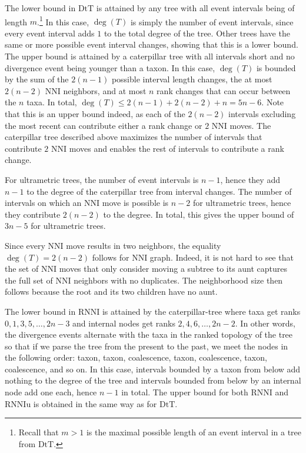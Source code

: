 \documentclass[11pt]{amsart}
\theoremstyle{definition}
\newcommand{\nni}{\mathrm{NNI}}
\newcommand{\rnni}{\mathrm{RNNI}}
\newcommand{\rnniu}{\mathrm{RNNIu}}
\newcommand{\dtt}{\mathrm{DtT}}
\begin{document}
\proof
The lower bound in $\dtt$ is attained by any tree with all event intervals being of length $m$.\footnote{
Recall that $m > 1$ is the maximal possible length of an event interval in a tree from $\dtt$.}
In this case, $\deg(T)$ is simply the number of event intervals, since every event interval adds $1$ to the total degree of the tree.
Other trees have the same or more possible event interval changes, showing that this is a lower bound.
The upper bound is attained by a caterpillar tree with all intervals short and no divergence event being younger than a taxon.
In this case, $\deg(T)$ is bounded by the sum of the $2(n-1)$ possible interval length changes, the at most $2(n-2)$ $\nni$ neighbors, and at most $n$ rank changes that can occur between the $n$ taxa.
In total, $\deg(T) \le 2(n-1) + 2(n-2) + n = 5n-6$.
Note that this is an upper bound indeed, as each of the $2(n-2)$ intervals excluding the most recent can contribute either a rank change or $2$ $\nni$ moves.
The caterpillar tree described above maximizes the number of intervals that contribute $2$ $\nni$ moves and enables the rest of intervals to contribute a rank change.

For ultrametric trees, the number of event intervals is $n-1$, hence they add $n-1$ to the degree of the caterpillar tree from interval changes.
The number of intervals on which an $\nni$ move is possible is $n-2$ for ultrametric trees, hence they contribute $2(n-2)$ to the degree.
In total, this gives the upper bound of $3n-5$ for ultrametric trees.

Since every $\nni$ move results in two neighbors, the equality $\deg(T) = 2(n-2)$ follows for $\nni$ graph.
Indeed, it is not hard to see that the set of $\nni$ moves that only consider moving a subtree to its aunt captures the full set of $\nni$ neighbors with no duplicates.
The neighborhood size then follows because the root and its two children have no aunt.

The lower bound in $\rnni$ is attained by the caterpillar-tree where taxa get ranks $0, 1, 3, 5, \ldots, 2n-3$ and internal nodes get ranks $2, 4, 6, \ldots, 2n-2$.
In other words, the divergence events alternate with the taxa in the ranked topology of the tree so that if we parse the tree from the present to the past, we meet the nodes in the following order: taxon, taxon, coalescence, taxon, coalescence, taxon, coalescence, and so on.
In this case, intervals bounded by a taxon from below add nothing to the degree of the tree and intervals bounded from below by an internal node add one each, hence $n-1$ in total.
The upper bound for both $\rnni$ and $\rnniu$ is obtained in the same way as for $\dtt$.
\end{document}
